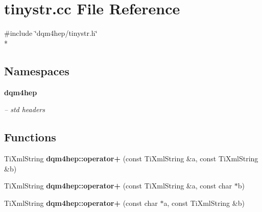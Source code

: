 \section{tinystr.\+cc File Reference}
\label{tinystr_8cc}
{\ttfamily \#include \char`\"{}dqm4hep/tinystr.\+h\char`\"{}}\\*
\subsection*{Namespaces}
\begin{DoxyCompactItemize}
\item 
 {\bf dqm4hep}
\begin{DoxyCompactList}\small\item\em -- std headers \end{DoxyCompactList}\end{DoxyCompactItemize}
\subsection*{Functions}
\begin{DoxyCompactItemize}
\item 
Ti\+Xml\+String {\bf dqm4hep\+::operator+} (const Ti\+Xml\+String \&a, const Ti\+Xml\+String \&b)
\item 
Ti\+Xml\+String {\bf dqm4hep\+::operator+} (const Ti\+Xml\+String \&a, const char $\ast$b)
\item 
Ti\+Xml\+String {\bf dqm4hep\+::operator+} (const char $\ast$a, const Ti\+Xml\+String \&b)
\end{DoxyCompactItemize}
